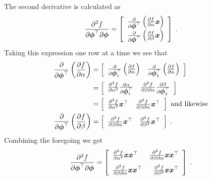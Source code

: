 The second derivative is calculated as
\[
\frac{\partial^2 f}{\partial \mbox{$\boldsymbol{\phi}$}^{\top} \partial \mbox{$\boldsymbol{\phi}$}} =
\left [ \begin{array}{c}
\frac{\partial}{\partial \mbox{$\boldsymbol{\phi}$}^{\top}}
\left ( \frac{\partial f}{\partial \alpha} \mbox{$\boldsymbol{x}$} \right) \\
\frac{\partial}{\partial \mbox{$\boldsymbol{\phi}$}^{\top}}
 \left ( \frac{\partial f}{\partial \beta} \mbox{$\boldsymbol{x}$} \right) \end{array}
\right ] \; .
\]
Taking this expression one row at a time we see that
\begin{align*}
\frac{\partial}{\partial \mbox{$\boldsymbol{\phi}$}^{\top}}
\left ( \frac{\partial f}{\partial \alpha} \right)
&= \left [ \begin{array}{lr}
\frac{\partial}{\partial \mbox{$\boldsymbol{\phi}$}_1^{\top}}
\left ( \frac{\partial f}{\partial \alpha} \right)
& 
\frac{\partial}{\partial \mbox{$\boldsymbol{\phi}$}_2^{\top}}
 \left ( \frac{\partial f}{\partial \alpha} \right)
\end{array} \right ] \\
&= \left [ \begin{array}{lr}
\frac{\partial^2 f}{\partial \alpha^2}
\frac{\partial \alpha}{\partial \mbox{$\boldsymbol{\phi}$}_1^{\top}} &
\frac{\partial^2 f}{\partial \beta \partial \alpha}
\frac{\partial \beta}{\partial \mbox{$\boldsymbol{\phi}$}_2^{\top}} \end{array} \right ] \\
&= \left [ \begin{array}{lr}
\frac{\partial^2 f}{\partial \alpha^2} \mbox{$\boldsymbol{x}$}^{\top} &
\frac{\partial^2 f}{\partial \beta \partial \alpha} \mbox{$\boldsymbol{x}$}^{\top}
\end{array} \right ] \mbox{~and likewise}\\
\frac{\partial}{\partial \mbox{$\boldsymbol{\phi}$}^{\top}}
\left ( \frac{\partial f}{\partial \beta} \right) & =
\left [ \begin{array}{lr}
\frac{\partial^2 f}{\partial \beta \partial \alpha} \mbox{$\boldsymbol{x}$}^{\top} &
\frac{\partial^2 f}{\partial \beta^2} \mbox{$\boldsymbol{x}$}^{\top}
\end{array} \right ] \; .
\end{align*}
Combining the foregoing we get
\[
\frac{\partial^2 f}{\partial \mbox{$\boldsymbol{\phi}$}^{\top} \partial \mbox{$\boldsymbol{\phi}$}} =
\left [ \begin{array}{lr}
\frac{\partial^2 f}{\partial \alpha^2} \mbox{$\boldsymbol{x}$} \mbox{$\boldsymbol{x}$}^{\top} &
\frac{\partial^2 f}{\partial \beta \partial \alpha} \mbox{$\boldsymbol{x}$} \mbox{$\boldsymbol{x}$}^{\top} \\[0.25cm]
\frac{\partial^2 f}{\partial \beta \partial \alpha} \mbox{$\boldsymbol{x}$} \mbox{$\boldsymbol{x}$}^{\top} &
\frac{\partial^2 f}{\partial \beta^2} \mbox{$\boldsymbol{x}$} \mbox{$\boldsymbol{x}$}^{\top}
\end{array} \right ] \; .
\]
